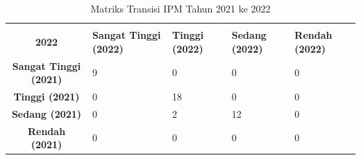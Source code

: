 \begin{table}[H]
\centering
\caption{Matriks Transisi IPM Tahun 2021 ke 2022} \label{tab:ipm_transisi_2021_2022}
\begin{tabular}{|c|p{2cm}|p{2cm}|p{2cm}|p{2cm}|}
\hline
\makecell{\textbf{Tahun 2021} \\ \textbf{2022}} & \textbf{Sangat Tinggi (2022)} & \textbf{Tinggi (2022)} & \textbf{Sedang (2022)} & \textbf{Rendah (2022)} \\ \hline
\textbf{Sangat Tinggi (2021)} & 9 & 0 & 0 & 0 \\ \hline
\textbf{Tinggi (2021)} & 0 & 18 & 0 & 0 \\ \hline
\textbf{Sedang (2021)} & 0 & 2 & 12 & 0 \\ \hline
\textbf{Rendah (2021)} & 0 & 0 & 0 & 0 \\ \hline
\end{tabular}
\end{table}